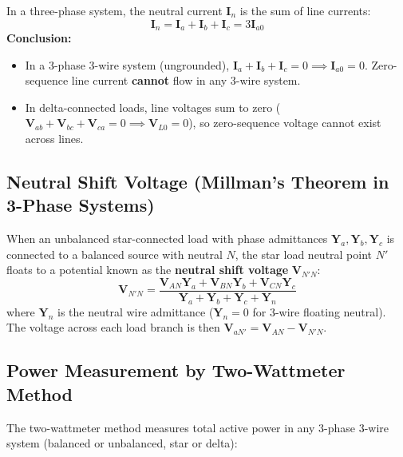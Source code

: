 \documentclass[12pt,a4paper]{article}
\begin{document}
\begin{tcolorbox}[examplebox, title={\textbf{Physical Consequence: Zero-Sequence Current in Three-Phase Circuits}}]
In a three-phase system, the neutral current $\mathbf{I}_n$ is the sum of line currents:
\begin{equation}
  \mathbf{I}_n = \mathbf{I}_a + \mathbf{I}_b + \mathbf{I}_c = 3 \mathbf{I}_{a0}
\end{equation}
\textbf{Conclusion:}
\begin{itemize}[leftmargin=*, itemsep=2pt]
  \item In a 3-phase 3-wire system (ungrounded), $\mathbf{I}_a + \mathbf{I}_b + \mathbf{I}_c = 0 \implies \mathbf{I}_{a0} = 0$. Zero-sequence line current \textbf{cannot} flow in any 3-wire system.
  \item In delta-connected loads, line voltages sum to zero ($\mathbf{V}_{ab} + \mathbf{V}_{bc} + \mathbf{V}_{ca} = 0 \implies \mathbf{V}_{L0} = 0$), so zero-sequence voltage cannot exist across lines.
\end{itemize}
\end{tcolorbox}

\subsection{Neutral Shift Voltage (Millman's Theorem in 3-Phase Systems)}
When an unbalanced star-connected load with phase admittances $\mathbf{Y}_a, \mathbf{Y}_b, \mathbf{Y}_c$ is connected to a balanced source with neutral $N$, the star load neutral point $N'$ floats to a potential known as the \textbf{neutral shift voltage} $\mathbf{V}_{N'N}$:
\begin{equation}
  \mathbf{V}_{N'N} = \frac{\mathbf{V}_{AN} \mathbf{Y}_a + \mathbf{V}_{BN} \mathbf{Y}_b + \mathbf{V}_{CN} \mathbf{Y}_c}{\mathbf{Y}_a + \mathbf{Y}_b + \mathbf{Y}_c + \mathbf{Y}_n}
\end{equation}
where $\mathbf{Y}_n$ is the neutral wire admittance ($\mathbf{Y}_n = 0$ for 3-wire floating neutral). The voltage across each load branch is then $\mathbf{V}_{aN'} = \mathbf{V}_{AN} - \mathbf{V}_{N'N}$.

\subsection{Power Measurement by Two-Wattmeter Method}
The two-wattmeter method measures total active power in any 3-phase 3-wire system (balanced or unbalanced, star or delta):
\end{document}
